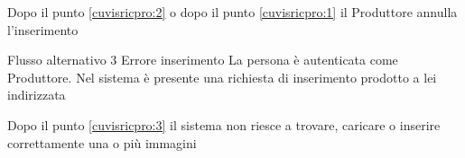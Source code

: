 {\begin{enumCU}
		\item Dopo il punto \ref{cuvisricpro:2} o dopo il punto \ref{cuvisricpro:1} il Produttore annulla l'inserimento
	\end{enumCU}}%
%
{Flusso alternativo 3}%
{Errore inserimento}%
{La persona è autenticata come Produttore. Nel sistema è presente una richiesta di inserimento prodotto a lei indirizzata}
{\postNulle}%
{\begin{enumCU}
		\item Dopo il punto \ref{cuvisricpro:3} il sistema non riesce a trovare, caricare o inserire correttamente una o più immagini
	\end{enumCU}}%


